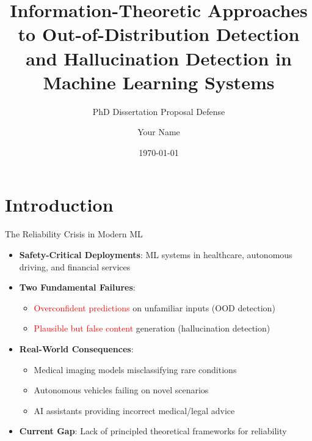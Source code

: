 \documentclass[aspectratio=169]{beamer}
\title[Information-Theoretic Approaches to ML Reliability]{Information-Theoretic Approaches to Out-of-Distribution Detection and Hallucination Detection in Machine Learning Systems}
\subtitle{PhD Dissertation Proposal Defense}
\author{Your Name}
\institute{Your University}
\date{\today}
\begin{document}
\begin{frame}
\titlepage
\end{frame}

\section{Introduction}

\begin{frame}{The Reliability Crisis in Modern ML}
\begin{itemize}
    \item \textbf{Safety-Critical Deployments}: ML systems in healthcare, autonomous driving, and financial services
    \item \textbf{Two Fundamental Failures}:
    \begin{itemize}
        \item \textcolor{red}{Overconfident predictions} on unfamiliar inputs (OOD detection)
        \item \textcolor{red}{Plausible but false content} generation (hallucination detection)
    \end{itemize}
    \item \textbf{Real-World Consequences}:
    \begin{itemize}
        \item Medical imaging models misclassifying rare conditions
        \item Autonomous vehicles failing on novel scenarios
        \item AI assistants providing incorrect medical/legal advice
    \end{itemize}
    \item \textbf{Current Gap}: Lack of principled theoretical frameworks for reliability
\end{itemize}
\end{frame}
\end{document}
